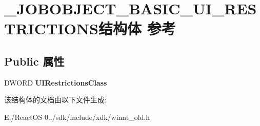 \hypertarget{struct___j_o_b_o_b_j_e_c_t___b_a_s_i_c___u_i___r_e_s_t_r_i_c_t_i_o_n_s}{}\section{\+\_\+\+J\+O\+B\+O\+B\+J\+E\+C\+T\+\_\+\+B\+A\+S\+I\+C\+\_\+\+U\+I\+\_\+\+R\+E\+S\+T\+R\+I\+C\+T\+I\+O\+N\+S结构体 参考}
\label{struct___j_o_b_o_b_j_e_c_t___b_a_s_i_c___u_i___r_e_s_t_r_i_c_t_i_o_n_s}
\subsection*{Public 属性}
\begin{DoxyCompactItemize}
\item 
\mbox{\label{struct___j_o_b_o_b_j_e_c_t___b_a_s_i_c___u_i___r_e_s_t_r_i_c_t_i_o_n_s_aac78610aba33154187cc3082d8154842}} 
D\+W\+O\+RD {\bfseries U\+I\+Restrictions\+Class}
\end{DoxyCompactItemize}


该结构体的文档由以下文件生成\+:\begin{DoxyCompactItemize}
\item 
E\+:/\+React\+O\+S-\/0../sdk/include/xdk/winnt\+\_\+old.\+h\end{DoxyCompactItemize}
